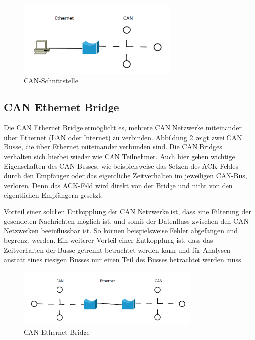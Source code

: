 \begin{figure}[h] 
\centering
\includegraphics[width=0.7\textwidth]{figures/can_gateway}
\caption{CAN-Schnittstelle} 
\label{gateway}
\end{figure} 

\subsection{CAN Ethernet Bridge}

Die CAN Ethernet Bridge ermöglicht es, mehrere CAN Netzwerke miteinander über Ethernet 
(LAN oder Internet) zu verbinden. Abbildung \ref{bridge} zeigt zwei CAN Busse, die über 
Ethernet miteinander verbunden sind. Die CAN Bridges verhalten sich hierbei wieder wie 
CAN Teilnehmer. Auch hier gehen wichtige Eigenschaften des CAN-Busses, wie beispielsweise 
das Setzen des ACK-Feldes durch den Empfänger oder das eigentliche Zeitverhalten im 
jeweiligen CAN-Bus, verloren. Denn das ACK-Feld wird direkt von der Bridge und nicht von 
den eigentlichen Empfängern gesetzt.

Vorteil einer solchen Entkopplung der CAN Netzwerke ist, dass eine Filterung der gesendeten 
Nachrichten möglich ist, und somit der Datenfluss zwischen den CAN Netzwerken beeinflussbar 
ist. So können beispielsweise Fehler abgefangen und begrenzt werden. Ein weiterer Vorteil 
einer Entkopplung ist, dass das Zeitverhalten der Busse getrennt betrachtet werden kann 
und für Analysen anstatt eines riesigen Busses nur einen Teil des Busses betrachtet werden 
muss.

\begin{figure}[h] 
\centering
\includegraphics[width=0.8\textwidth]{figures/can_bridge}
\caption{CAN Ethernet Bridge} 
\label{bridge}
\end{figure}

\newpage {} \listoffigures

\newpage {}
% 



